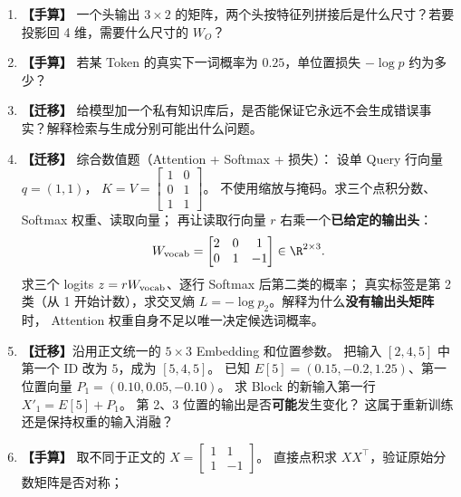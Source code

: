 \begin{enumerate}[label=\textbf{C1-\arabic*.},leftmargin=2.8em]
\item {}\label{exercise:C1-10}   \textbf{【手算】} 一个头输出 $3\times2$ 的矩阵，两个头按特征列拼接后是什么尺寸？若要投影回 4 维，需要什么尺寸的 $W_O$？
\item {}\label{exercise:C1-11}   \textbf{【手算】} 若某 Token 的真实下一词概率为 $0.25$，单位置损失 $-\log p$ 约为多少？
\item {}\label{exercise:C1-12}   \textbf{【迁移】} 给模型加一个私有知识库后，是否能保证它永远不会生成错误事实？解释检索与生成分别可能出什么问题。
\item {}\label{exercise:C1-13}   \textbf{【迁移】} 综合数值题（Attention + Softmax + 损失）：
设单 Query 行向量 $q=(1,1)$，
$K=V=\begin{bmatrix}1&0\\0&1\\1&1\end{bmatrix}$。
不使用缩放与掩码。求三个点积分数、Softmax 权重、读取向量；
再让读取行向量 $r$ 右乘一个\textbf{已给定的输出头}：
\[
W_{\rm vocab}=\begin{bmatrix}
2&0&1\\0&1&-1
\end{bmatrix}\in\R^{2\times3}.
\]
求三个 logits $z=rW_{\rm vocab}$、逐行 Softmax 后第二类的概率；
真实标签是第 2 类（从 1 开始计数），求交叉熵
$L=-\log p_2$。解释为什么\textbf{没有输出头矩阵}时，
Attention 权重自身不足以唯一决定候选词概率。
\item {}\label{exercise:C1-14}   \textbf{【迁移】}沿用正文统一的 $5\times3$ Embedding 和位置参数。
把输入 $[2,4,5]$ 中第一个 ID 改为 $5$，成为 $[5,4,5]$。
已知 $E[5]=(0.15,-0.2,1.25)$、第一位置向量
$P_1=(0.10,0.05,-0.10)$。
求 Block 的新输入第一行 $X'_1=E[5]+P_1$。
第 2、3 位置的输出是否\textbf{可能}发生变化？
这属于重新训练还是保持权重的输入消融？
\item {}\label{exercise:C1-15}   \textbf{【手算】} 取不同于正文的
$X=\begin{bmatrix}1&1\\1&-1\end{bmatrix}$。
直接点积求 $XX^\top$，验证原始分数矩阵是否对称；

\end{enumerate}
